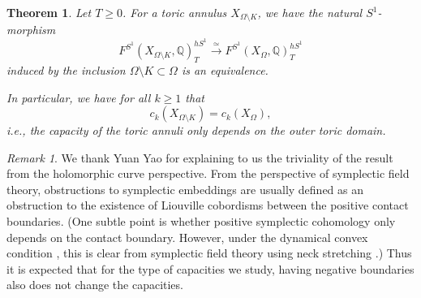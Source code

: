 \documentclass[11pt]{amsart}
\numberwithin{equation}{section}
\theoremstyle{plain}
\newtheorem{Thm}{Theorem}[section]
\theoremstyle{definition}
\theoremstyle{remark}
\newtheorem{RMK}[rmk]{Remark}
\newcommand{\bQ} { {\mathbb{Q}}}
\begin{document}
\begin{Thm}\label{thm: toric annuli homology and capacity}Let $T\geq 0$. For a toric annulus $X_{\Omega\setminus K}$, we have the natural $S^1$-morphism 
\[F^{S^1}(X_{\Omega\setminus K},\bQ)_{T}^{hS^1} \xrightarrow{\simeq } F^{S^1} (X_{\Omega},\bQ)_{T}^{hS^1}   \]
induced by the inclusion $\Omega\setminus K \subset   \Omega$ is an equivalence.

In particular, we have for all $k\geq 1$ that 
\[c_k(X_{\Omega\setminus K})=c_k(X_{\Omega}),\]
i.e., the capacity of the toric annuli only depends on the outer toric domain.
\end{Thm}
\begin{RMK}We thank Yuan Yao for explaining to us the triviality of the result from the holomorphic curve perspective. From the perspective of symplectic field theory, obstructions to symplectic embeddings are usually defined as an obstruction to the existence of Liouville cobordisms between the positive contact boundaries. (One subtle point is whether positive symplectic cohomology only depends on the contact boundary. However, under the dynamical convex condition \cite{HoferWysockiZehnder,Cieliebak-Oancea-ES}, this is clear from symplectic field theory using neck stretching \cite{Bourgeois-Oancea-17,HutchingsNelson}.) Thus it is expected that for the type of capacities we study, having negative boundaries also does not change the capacities.
\end{RMK}
\end{document}
